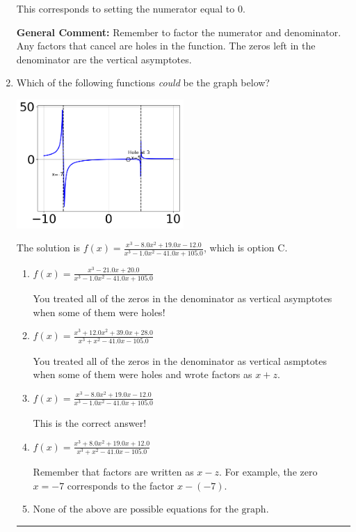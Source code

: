 \documentclass{extbook}[14pt]
\newcommand{\litem}[1]{\item #1

\rule{\textwidth}{0.4pt}}
\begin{document}
\begin{enumerate}
{\begin{enumerate}[label=\Alph*.]
This corresponds to setting the numerator equal to 0.
\end{enumerate}

\textbf{General Comment:} Remember to factor the numerator and denominator. Any factors that cancel are holes in the function. The zeros left in the denominator are the vertical asymptotes.
}
\litem{
Which of the following functions \textit{could} be the graph below?

\begin{center}
    \includegraphics[width=0.5\textwidth]{../Figures/identifyGraphOfRationalFunctionCopyC.png}
\end{center}


The solution is \( f(x)=\frac{x^{3} -8.0 x^{2} +19.0 x -12.0}{x^{3} -1.0 x^{2} -41.0 x + 105.0} \), which is option C.\begin{enumerate}[label=\Alph*.]
\item \( f(x)=\frac{x^{3} -21.0 x + 20.0}{x^{3} -1.0 x^{2} -41.0 x + 105.0} \)

You treated all of the zeros in the denominator as vertical asymptotes when some of them were holes!
\item \( f(x)=\frac{x^{3} +12.0 x^{2} +39.0 x + 28.0}{x^{3} + x^{2} -41.0 x -105.0} \)

You treated all of the zeros in the denominator as vertical asmptotes when some of them were holes and wrote factors as $x+z$.
\item \( f(x)=\frac{x^{3} -8.0 x^{2} +19.0 x -12.0}{x^{3} -1.0 x^{2} -41.0 x + 105.0} \)

This is the correct answer!
\item \( f(x)=\frac{x^{3} +8.0 x^{2} +19.0 x + 12.0}{x^{3} + x^{2} -41.0 x -105.0} \)

Remember that factors are written as $x-z$. For example, the zero $x=-7$ corresponds to the factor $x-(-7)$.
\item \( \text{None of the above are possible equations for the graph.} \)


\end{enumerate}}
\end{enumerate}
\end{document}
